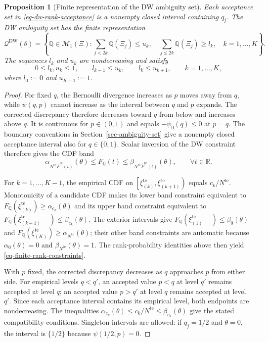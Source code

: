 \documentclass[review,11pt,3p,authoryear,nopreprintline]{elsarticle}
\newtheorem{proposition}{Proposition}
\begin{document}
\begin{proposition}[Finite representation of the DW ambiguity set]
  \label{prop-finite-rank-constraints}
  Each acceptance set in \eqref{eq-dw-rank-acceptance} is a nonempty closed interval containing $q_j$. The DW ambiguity set has the finite representation
  \begin{equation}
    \mathcal Q^{\mathrm{DW}}(\theta)
    =\left\{\mathbb Q\in\mathcal M_1(\Xi):
      \sum_{j<2k}\mathbb Q(\Xi_j)\le u_k,\quad
      \sum_{j\le2k}\mathbb Q(\Xi_j)\ge l_k,\quad k=1,\ldots,K\right\}.
    \label{eq-finite-rank-constraints}
  \end{equation}
  The sequences $l_k$ and $u_k$ are nondecreasing and satisfy
  \[
    0\le l_k,u_k\le1,\qquad l_{k-1}\le u_k,\qquad l_k\le u_{k+1},
    \qquad k=1,\ldots,K,
  \]
  where $l_0:=0$ and $u_{K+1}:=1$.
\end{proposition}
\begin{proof}
  For fixed $q$, the Bernoulli divergence increases as $p$ moves away from $q$, while $\psi(q,p)$ cannot increase as the interval between $q$ and $p$ expands. The corrected discrepancy therefore decreases toward $q$ from below and increases above $q$. It is continuous for $p\in(0,1)$ and equals $-\psi_0(q)\le0$ at $p=q$. The boundary conventions in Section~\ref{sec-ambiguity-set} give a nonempty closed acceptance interval also for $q\in\{0,1\}$. Scalar inversion of the DW constraint therefore gives the CDF band \citep[Supplement, Section~S.6]{L.J23}
  \[
    \alpha_{N^{\mathrm{te}}\widehat F^{\mathrm{te}}(t)}(\theta)
      \le F_{\mathbb Q}(t)
      \le\beta_{N^{\mathrm{te}}\widehat F^{\mathrm{te}}(t)}(\theta),
    \qquad\forall t\in\mathbb R.
  \]

  For $k=1,\ldots,K-1$, the empirical CDF on $\left[\xi_{(k)}^{\mathrm{te}},\xi_{(k+1)}^{\mathrm{te}}\right)$ equals $c_k/N^{\mathrm{te}}$. Monotonicity of a candidate CDF makes its lower band constraint equivalent to $F_{\mathbb Q}\left(\xi_{(k)}^{\mathrm{te}}\right)\ge\alpha_{c_k}(\theta)$ and its upper band constraint equivalent to $F_{\mathbb Q}\left(\xi_{(k+1)}^{\mathrm{te}}-\right)\le\beta_{c_k}(\theta)$. The exterior intervals give $F_{\mathbb Q}\left(\xi_{(1)}^{\mathrm{te}}-\right)\le\beta_0(\theta)$ and $F_{\mathbb Q}\left(\xi_{(K)}^{\mathrm{te}}\right)\ge\alpha_{N^{\mathrm{te}}}(\theta)$; their other band constraints are automatic because $\alpha_0(\theta)=0$ and $\beta_{N^{\mathrm{te}}}(\theta)=1$. The rank-probability identities above then yield \eqref{eq-finite-rank-constraints}.

  With $p$ fixed, the corrected discrepancy decreases as $q$ approaches $p$ from either side. For empirical levels $q<q'$, an accepted value $p<q$ at level $q'$ remains accepted at level $q$; an accepted value $p>q'$ at level $q$ remains accepted at level $q'$. Since each acceptance interval contains its empirical level, both endpoints are nondecreasing. The inequalities $\alpha_{c_k}(\theta)\le c_k/N^{\mathrm{te}}\le\beta_{c_k}(\theta)$ give the stated compatibility conditions. Singleton intervals are allowed: if $q_j=1/2$ and $\theta=0$, the interval is $\{1/2\}$ because $\psi(1/2,p)=0$.
\end{proof}
\end{document}
